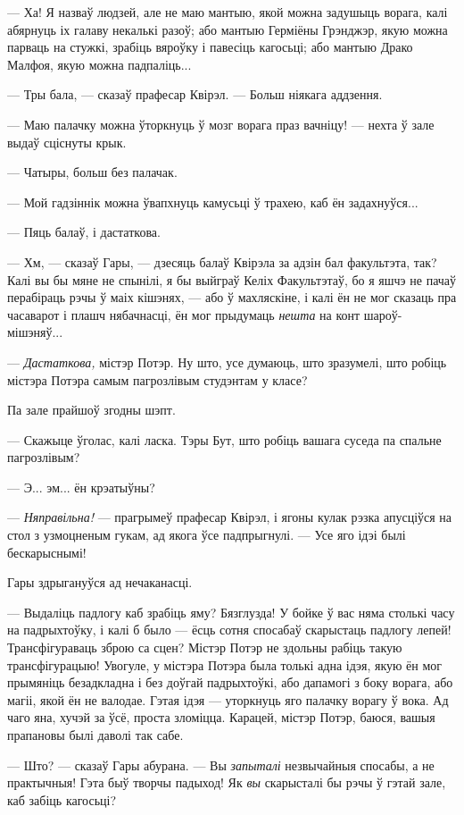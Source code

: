 --- Ха! Я назваў людзей, але не маю мантыю, якой можна задушыць ворага, калі абярнуць 
іх галаву некалькі разоў; або мантыю Герміёны Грэнджэр, якую можна парваць на стужкі,
зрабіць вяроўку і павесіць кагосьці; або мантыю Драко Малфоя, якую можна падпаліць...

--- Тры бала, --- сказаў прафесар Квірэл. --- Больш ніякага аддзення.

--- Маю палачку можна ўторкнуць ў мозг ворага праз вачніцу! --- нехта ў зале 
выдаў сціснуты крык.

--- Чатыры, больш без палачак.

--- Мой гадзіннік можна ўвапхнуць камусьці ў трахею, каб ён задахнуўся...

--- Пяць балаў, і дастаткова.

--- Хм, --- сказаў Гары, --- дзесяць балаў Квірэла за адзін бал факультэта, так? 
Калі вы бы мяне не спынілі, я бы выйграў Келіх Факультэтаў, бо я яшчэ не пачаў 
перабіраць рэчы ў маіх кішэнях, --- або ў махляскіне, і калі ён не мог сказаць 
пра часаварот і плашч нябачнасці, ён мог прыдумаць  \emph{нешта} на конт 
шароў-мішэняў...

--- \emph{Дастаткова,} містэр Потэр. Ну што, усе думаюць, што зразумелі, што робіць містэра Потэра 
самым пагрозлівым студэнтам у класе?

Па зале прайшоў згодны шэпт.

--- Скажыце ўголас, калі ласка. Тэры Бут, што робіць вашага суседа па спальне 
пагрозлівым?

--- Э... эм... ён крэатыўны?

--- \emph{Няправільна!} --- прагрымеў прафесар Квірэл, і ягоны кулак рэзка апусціўся
на стол з узмоцненым гукам, ад якога ўсе падпрыгнулі. --- Усе яго ідэі былі бескарыснымі!

Гары здрыгануўся ад нечаканасці.

--- Выдаліць падлогу каб зрабіць яму? Бязглузда! У бойке ў вас няма столькі часу
на падрыхтоўку, і калі б было --- ёсць сотня спосабаў скарыстаць падлогу лепей!
Трансфігураваць зброю са сцен? Містэр Потэр не здольны рабіць такую трансфігурацыю!
Увогуле, у містэра Потэра была толькі адна ідэя, якую ён мог прымяніць безадкладна 
і без доўгай падрыхтоўкі, або дапамогі з боку ворага, або магіі, якой ён не валодае.
Гэтая ідэя --- уторкнуць яго палачку ворагу ў вока. Ад чаго яна, хучэй за ўсё,
проста зломіцца. Карацей, містэр Потэр, баюся, вашыя прапановы былі даволі 
так сабе.

--- Што? --- сказаў Гары абурана. --- Вы \emph{запыталі} незвычайныя спосабы, а не 
практычныя! Гэта быў творчы падыход! Як \emph{вы} скарысталі бы рэчы ў гэтай зале,
каб забіць кагосьці?

